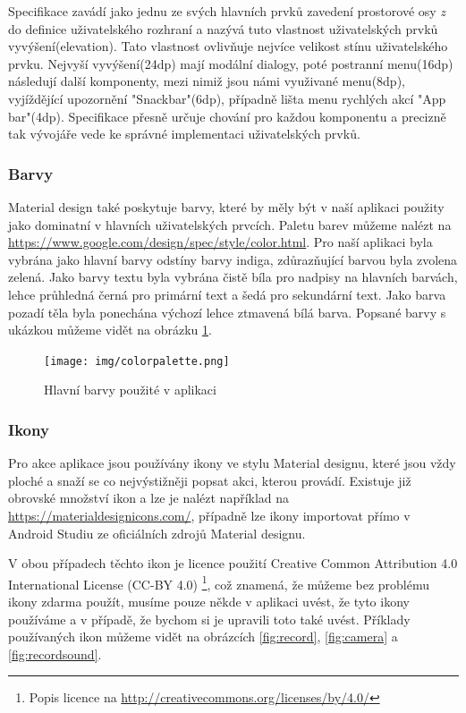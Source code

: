 \documentclass{article}
\begin{document}
  Specifikace zavádí jako jednu ze svých hlavních prvků zavedení prostorové osy \textit{z} do
  definice uživatelského rozhraní a nazývá tuto vlastnost uživatelských prvků vyvýšení(elevation)\cite{materialdesign}.
  Tato vlastnost ovlivňuje nejvíce velikost stínu uživatelského prvku. Nejvyší vyvýšení(24dp)
  mají modální dialogy, poté postranní menu(16dp) následují další komponenty, mezi nimiž jsou námi využivané
  menu(8dp), vyjíždějící upozornění "Snackbar"(6dp), případně lišta menu rychlých akcí "App bar"(4dp)\cite{materialdesign}.
  Specifikace přesně určuje chování pro každou komponentu a precizně tak vývojáře vede ke správné
  implementaci uživatelských prvků.


\subsubsection{Barvy}
  Material design také poskytuje barvy, které by měly být v naší aplikaci použity jako dominatní v hlavních
  uživatelských prvcích. Paletu barev můžeme nalézt na \url{https://www.google.com/design/spec/style/color.html}.
  Pro naší aplikaci byla vybrána jako hlavní barvy odstíny barvy indiga, zdůrazňující barvou byla zvolena zelená.
  Jako barvy textu byla vybrána čistě bíla pro nadpisy na hlavních barvách, lehce průhledná černá pro
  primární text a šedá pro sekundární text. Jako barva pozadí těla byla ponechána výchozí lehce ztmavená bílá
  barva. Popsané barvy s ukázkou můžeme vidět na obrázku \ref{fig:colorpalette}.

  \begin{figure}[H]
          \centering
                  \texttt{[image: img/colorpalette.png]}
          \caption{Hlavní barvy použité v aplikaci}
          \label{fig:colorpalette}
  \end{figure}

\subsubsection{Ikony}
Pro akce aplikace jsou používány ikony ve stylu Material designu, které jsou vždy ploché
a snaží se co nejvýstižněji popsat akci, kterou provádí. Existuje již obrovské množství
ikon a lze je nalézt například na \url{https://materialdesignicons.com/}, případně lze ikony
importovat přímo v Android Studiu ze oficiálních zdrojů Material designu.

V obou případech těchto ikon je licence použití Creative Common Attribution 4.0 International License (CC-BY 4.0)
\footnote{Popis licence na \url{http://creativecommons.org/licenses/by/4.0/}}, což znamená,
že můžeme bez problému ikony zdarma použít, musíme pouze někde v aplikaci uvést, že tyto ikony
používáme a v případě, že bychom si je upravili toto také uvést.
Příklady používaných ikon můžeme vidět na obrázcích \ref{fig:record}, \ref{fig:camera} a \ref{fig:recordsound}.
\end{document}
